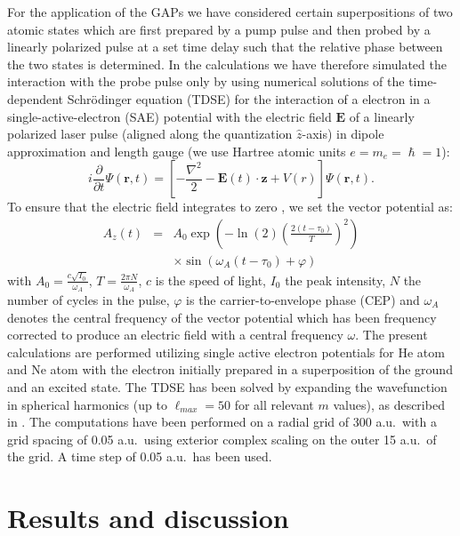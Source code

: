 For the application of the GAPs we have considered certain superpositions of two atomic states which are first prepared by a pump pulse and then probed by a linearly polarized pulse at a set time delay such that the relative phase between the two states is determined. In the calculations we have therefore simulated the interaction with the probe pulse only by
using numerical solutions of the time-dependent Schr\"odinger equation (TDSE) for the interaction of a electron in a single-active-electron (SAE) potential with the electric field $\mathbf{E}$ of a linearly polarized laser pulse (aligned along the quantization ${\hat z}$-axis) in dipole approximation and length gauge (we use Hartree atomic units $e = m_e = \hslash =1$): 
\begin{equation}
i\frac{\partial}{\partial t}\Psi(\mathbf{r},t) = \left[-\frac{\nabla^2}{2} - \mathbf{E}(t) \cdot \mathbf{z} + V(r)\right]\Psi(\mathbf{r},t).
\end{equation}
To ensure that the electric field integrates to zero \cite{chelkowski_sensitivity_2002}, we set the vector potential as:
\begin{eqnarray}
A_z(t) &=& 
      A_0 \exp\left(-\ln(2)\left(\frac{2(t-\tau_0)}{T}\right)^2\right)
      \nonumber
      \\
      && \times \sin\left(\omega_A(t-\tau_0) + \varphi \right)
      \label{eq:vectorp}
\end{eqnarray}
with $A_0 = \frac{c\sqrt{I_0}}{\omega_A}$, $T = \frac{2\pi N}{\omega_A}$, $c$ is the speed of light, $I_0$ the peak intensity, $N$ the number of cycles in the pulse, $\varphi$ is the carrier-to-envelope phase (CEP) and $\omega_A$ denotes the central frequency of the vector potential which has been frequency corrected \cite{venzke_central_2018} to produce an electric field with a central frequency $\omega$.  The present calculations are performed utilizing single active electron potentials for He atom and Ne atom \cite{reiff_single-active_2020} with the electron initially prepared in a superposition of the ground and an excited state. The TDSE has been solved by expanding the wavefunction in spherical harmonics (up to $\ell_{max} = 50$ for all relevant $m$ values), as described in \cite{venzke_ionization_2020}. The computations have been performed on a radial grid of 300 a.u.\ with a grid spacing of 0.05 a.u.\, using exterior complex scaling on the outer 15 a.u.\ of the grid. A time step of 0.05 a.u.\ has been used.

\section*{Results and discussion}


